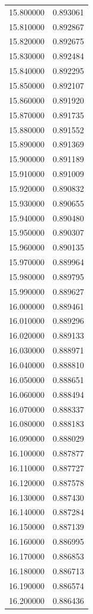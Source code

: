 \begin{tabular}{rr}
15.800000 & 0.893061 \\
15.810000 & 0.892867 \\
15.820000 & 0.892675 \\
15.830000 & 0.892484 \\
15.840000 & 0.892295 \\
15.850000 & 0.892107 \\
15.860000 & 0.891920 \\
15.870000 & 0.891735 \\
15.880000 & 0.891552 \\
15.890000 & 0.891369 \\
15.900000 & 0.891189 \\
15.910000 & 0.891009 \\
15.920000 & 0.890832 \\
15.930000 & 0.890655 \\
15.940000 & 0.890480 \\
15.950000 & 0.890307 \\
15.960000 & 0.890135 \\
15.970000 & 0.889964 \\
15.980000 & 0.889795 \\
15.990000 & 0.889627 \\
16.000000 & 0.889461 \\
16.010000 & 0.889296 \\
16.020000 & 0.889133 \\
16.030000 & 0.888971 \\
16.040000 & 0.888810 \\
16.050000 & 0.888651 \\
16.060000 & 0.888494 \\
16.070000 & 0.888337 \\
16.080000 & 0.888183 \\
16.090000 & 0.888029 \\
16.100000 & 0.887877 \\
16.110000 & 0.887727 \\
16.120000 & 0.887578 \\
16.130000 & 0.887430 \\
16.140000 & 0.887284 \\
16.150000 & 0.887139 \\
16.160000 & 0.886995 \\
16.170000 & 0.886853 \\
16.180000 & 0.886713 \\
16.190000 & 0.886574 \\
16.200000 & 0.886436 \\

\end{tabular}
